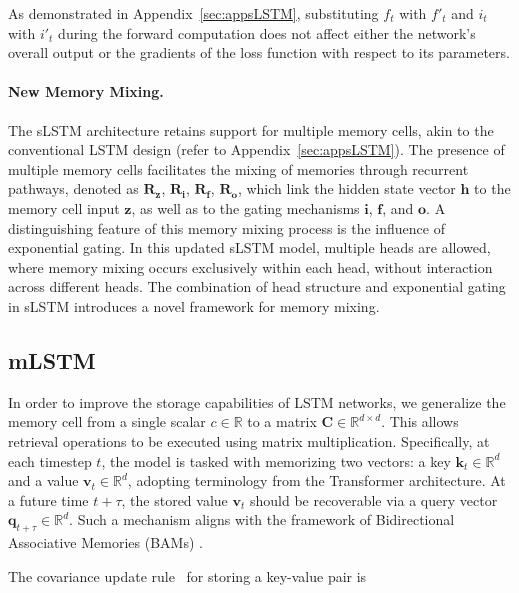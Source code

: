 As demonstrated in Appendix~\ref{sec:appsLSTM}, substituting $f_t$ with $f'_t$ and $i_t$ with $i'_t$ during the forward computation does not affect either the network's overall output or the gradients of the loss function with respect to its parameters.

\paragraph{New Memory Mixing.} The sLSTM architecture retains support for multiple memory cells, akin to the conventional LSTM design (refer to Appendix~\ref{sec:appsLSTM}).
The presence of multiple memory cells facilitates the mixing of memories through recurrent pathways, denoted as $\mathbf{R}_{\mathbf{z}}$, $\mathbf{R}_{\mathbf{i}}$, $\mathbf{R}_{\mathbf{f}}$, $\mathbf{R}_{\mathbf{o}}$, which link the hidden state vector $\mathbf{h}$ to the memory cell input $\mathbf{z}$, as well as to the gating mechanisms $\mathbf{i}$, $\mathbf{f}$, and $\mathbf{o}$.
A distinguishing feature of this memory mixing process is the influence of exponential gating. In this updated sLSTM model, multiple heads are allowed, where memory mixing occurs exclusively within each head, without interaction across different heads. The combination of head structure and exponential gating in sLSTM introduces a novel framework for memory mixing.

\subsection{mLSTM}
\label{sec:mLSTM}

In order to improve the storage capabilities of LSTM networks, we generalize the memory cell from a single scalar $c \in \mathbb{R}$ to a matrix $\mathbf{C} \in \mathbb{R}^{d \times d}$. This allows retrieval operations to be executed using matrix multiplication. Specifically, at each timestep $t$, the model is tasked with memorizing two vectors: a key $\mathbf{k}_t \in \mathbb{R}^d$ and a value $\mathbf{v}_t \in \mathbb{R}^d$, adopting terminology from the Transformer architecture. At a future time $t + \tau$, the stored value $\mathbf{v}_t$ should be recoverable via a query vector $\mathbf{q}_{t+\tau} \in \mathbb{R}^d$. Such a mechanism aligns with the framework of Bidirectional Associative Memories (BAMs) \citep{Kohonen:72,Anderson:72,Nakano:72,Anderson:77}.

The covariance update rule~\citep{Sejnowski:77,Dayan:91} for storing a key-value pair is

